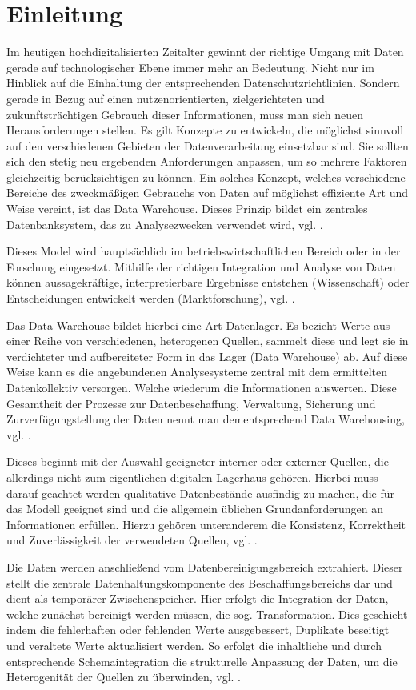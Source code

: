 \section{Einleitung}
Im heutigen hochdigitalisierten Zeitalter gewinnt der richtige Umgang mit Daten gerade auf technologischer Ebene immer mehr an Bedeutung. Nicht nur im Hinblick auf die Einhaltung der entsprechenden Datenschutzrichtlinien. Sondern gerade in Bezug auf einen nutzenorientierten, zielgerichteten und zukunftsträchtigen Gebrauch dieser Informationen, muss man sich neuen Herausforderungen stellen. Es gilt Konzepte zu entwickeln, die möglichst sinnvoll auf den verschiedenen Gebieten der Datenverarbeitung einsetzbar sind. Sie sollten sich den stetig neu ergebenden Anforderungen anpassen, um so mehrere Faktoren gleichzeitig berücksichtigen zu können. Ein solches Konzept, welches verschiedene Bereiche des zweckmäßigen Gebrauchs von Daten auf möglichst effiziente Art und Weise vereint, ist das Data Warehouse. Dieses Prinzip bildet ein zentrales Datenbanksystem, das zu Analysezwecken verwendet wird, vgl. \cite{dtw}.

Dieses Model wird hauptsächlich im betriebswirtschaftlichen Bereich oder in der Forschung eingesetzt.  Mithilfe der richtigen Integration und Analyse von Daten können aussagekräftige, interpretierbare Ergebnisse entstehen (Wissenschaft) oder Entscheidungen entwickelt werden (Marktforschung), vgl. \cite{vorlesung}. 

Das Data Warehouse bildet hierbei eine Art Datenlager. Es bezieht Werte aus einer Reihe von verschiedenen, heterogenen Quellen, sammelt diese und legt sie in verdichteter und aufbereiteter Form in das Lager (Data Warehouse) ab. Auf diese Weise kann es die angebundenen Analysesysteme zentral mit dem ermittelten Datenkollektiv versorgen. Welche wiederum die Informationen auswerten.  Diese Gesamtheit der Prozesse zur Datenbeschaffung, Verwaltung, Sicherung und Zurverfügungstellung der Daten nennt man dementsprechend Data Warehousing, vgl. \cite{dtw}. 

Dieses beginnt mit der Auswahl geeigneter interner oder externer Quellen, die allerdings nicht zum eigentlichen digitalen Lagerhaus gehören. Hierbei muss darauf geachtet werden qualitative Datenbestände ausfindig zu machen, die für das Modell geeignet sind und die allgemein üblichen Grundanforderungen an Informationen erfüllen. Hierzu gehören unteranderem die Konsistenz, Korrektheit und Zuverlässigkeit der verwendeten Quellen, vgl. \cite{vorlesung}. 

Die Daten werden anschließend vom Datenbereinigungsbereich extrahiert. Dieser stellt die zentrale Datenhaltungskomponente des Beschaffungsbereichs dar und dient als temporärer Zwischenspeicher. Hier erfolgt die Integration der Daten, welche zunächst bereinigt werden müssen, die sog. Transformation. Dies geschieht indem die fehlerhaften oder fehlenden Werte ausgebessert, Duplikate beseitigt und veraltete Werte aktualisiert werden. So erfolgt die inhaltliche und durch entsprechende Schemaintegration die strukturelle Anpassung der Daten, um die Heterogenität der Quellen zu überwinden, vgl. \cite{vorlesung}.  

